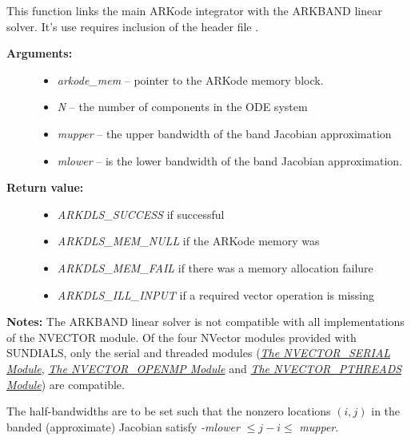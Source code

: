 \documentclass[letterpaper,10pt,english]{sphinxmanual}
\begin{document}
\begin{fulllineitems}
\label{c_interface/User_callable:ARKBand}
This function links the main ARKode integrator with the ARKBAND
linear solver.  It's use requires inclusion of the header file
.
\begin{description}
\item[{\textbf{Arguments:}}] \leavevmode\begin{itemize}
\item {} 
\emph{arkode\_mem} -- pointer to the ARKode memory block.

\item {} 
\emph{N} -- the number of components in the ODE system

\item {} 
\emph{mupper} -- the upper bandwidth of the band Jacobian approximation

\item {} 
\emph{mlower} -- is the lower bandwidth of the band Jacobian approximation.

\end{itemize}

\item[{\textbf{Return value:}}] \leavevmode\begin{itemize}
\item {} 
\emph{ARKDLS\_SUCCESS}   if successful

\item {} 
\emph{ARKDLS\_MEM\_NULL}  if the ARKode memory was 

\item {} 
\emph{ARKDLS\_MEM\_FAIL}  if there was a memory allocation failure

\item {} 
\emph{ARKDLS\_ILL\_INPUT} if a required vector operation is missing

\end{itemize}

\end{description}

\textbf{Notes:} The ARKBAND linear solver is not compatible with all
implementations of the NVECTOR module.  Of the four NVector
modules provided with SUNDIALS, only the serial and threaded
modules ({\hyperref[nvectors/NVector_Serial:nvectors-nvserial]{\emph{The NVECTOR\_SERIAL Module}}}, {\hyperref[nvectors/NVector_OpenMP:nvectors-openmp]{\emph{The NVECTOR\_OPENMP Module}}} and
{\hyperref[nvectors/NVector_Pthreads:nvectors-pthreads]{\emph{The NVECTOR\_PTHREADS Module}}}) are compatible.

The half-bandwidths are to be set such that the nonzero locations
$(i, j)$ in the banded (approximate) Jacobian satisfy \emph{-mlower}
$\le j-i \le$ \emph{mupper}.

\end{fulllineitems}
\end{document}
